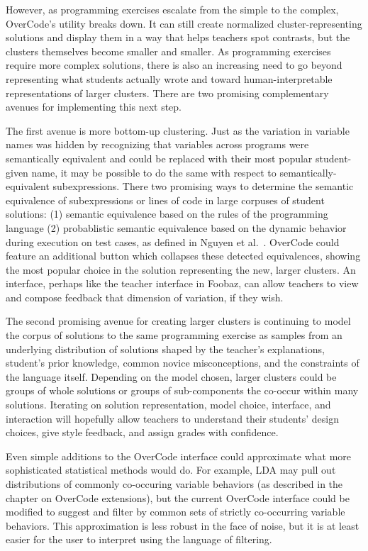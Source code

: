 However, as programming exercises escalate from the simple to the complex, OverCode's utility breaks down. It can still create normalized cluster-representing solutions and display them in a way that helps teachers spot contrasts, but the clusters themselves become smaller and smaller. As programming exercises require more complex solutions, there is also an increasing need to go beyond representing what students actually wrote and toward human-interpretable representations of larger clusters. There are two promising complementary avenues for implementing this next step.

The first avenue is more bottom-up clustering. Just as the variation in variable names was hidden by recognizing that variables across programs were semantically equivalent and could be replaced with their most popular student-given name, it may be possible to do the same with respect to semantically-equivalent subexpressions. There two promising ways to determine the semantic equivalence of subexpressions or lines of code in large corpuses of student solutions: (1) semantic equivalence based on the rules of the programming language (2) probablistic semantic equivalence based on the dynamic behavior during execution on test cases, as defined in Nguyen et al.~\cite{codewebs}. OverCode could feature an additional button which collapses these detected equivalences, showing the most popular choice in the solution representing the new, larger clusters. An interface, perhaps like the teacher interface in Foobaz, can allow teachers to view and compose feedback that dimension of variation, if they wish. 

The second promising avenue for creating larger clusters is continuing to model the corpus of solutions to the same programming exercise as samples from an underlying distribution of solutions shaped by the teacher's explanations, student's prior knowledge, common novice misconceptions, and the constraints of the language itself. Depending on the model chosen, larger clusters could be groups of whole solutions or groups of sub-components the co-occur within many solutions. Iterating on solution representation, model choice, interface, and interaction will hopefully allow teachers to understand their students' design choices, give style feedback, and assign grades with confidence. 

Even simple additions to the OverCode interface could approximate what more sophisticated statistical methods would do. For example, LDA may pull out distributions of commonly co-occuring variable behaviors (as described in the chapter on OverCode extensions), but the current OverCode interface could be modified to suggest and filter by common sets of strictly co-occurring variable behaviors. This approximation is less robust in the face of noise, but it is at least easier for the user to interpret using the language of filtering. %

